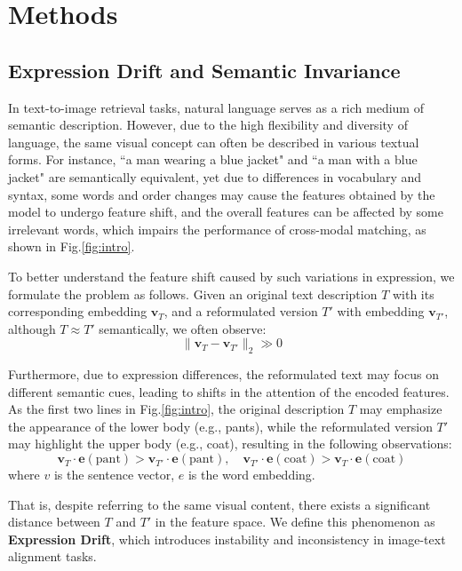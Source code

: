 \section{Methods}


\subsection{Expression Drift and Semantic Invariance}
In text-to-image retrieval tasks, natural language serves as a rich medium of semantic description. However, due to the high flexibility and diversity of language, the same visual concept can often be described in various textual forms. For instance, ``a man wearing a blue jacket" and ``a man with a blue jacket" are semantically equivalent, yet due to differences in vocabulary and syntax, some words and order changes may cause the features obtained by the model to undergo feature shift, and the overall features can be affected by some irrelevant words, which impairs the performance of cross-modal matching, as shown in Fig.\ref{fig:intro}.

To better understand the feature shift caused by such variations in expression, we formulate the problem as follows. Given an original text description \( T \) with its corresponding embedding \( \mathbf{v}_T \), and a reformulated version \( T' \) with embedding \( \mathbf{v}_{T'} \), although \( T \approx T' \) semantically, we often observe:
\begin{equation}
\|\mathbf{v}_T - \mathbf{v}_{T'}\|_2 \gg 0 
\end{equation}

Furthermore, due to expression differences, the reformulated text may focus on different semantic cues, leading to shifts in the attention of the encoded features. As the first two lines in Fig.\ref{fig:intro}, the original description \( T \) may emphasize the appearance of the lower body (e.g., pants), while the reformulated version \( T' \) may highlight the upper body (e.g., coat), resulting in the following observations:
\begin{equation}
\mathbf{v}_T \cdot \mathbf{e}(\text{pant}) > \mathbf{v}_{T'} \cdot \mathbf{e}(\text{pant}), \quad
\mathbf{v}_{T'} \cdot \mathbf{e}(\text{coat}) > \mathbf{v}_{T} \cdot \mathbf{e}(\text{coat})
\end{equation}
where $v$ is the sentence vector, $e$ is the word embedding.

That is, despite referring to the same visual content, there exists a significant distance between \( T \) and \( T' \) in the feature space. We define this phenomenon as \textbf{Expression Drift}, which introduces instability and inconsistency in image-text alignment tasks.

